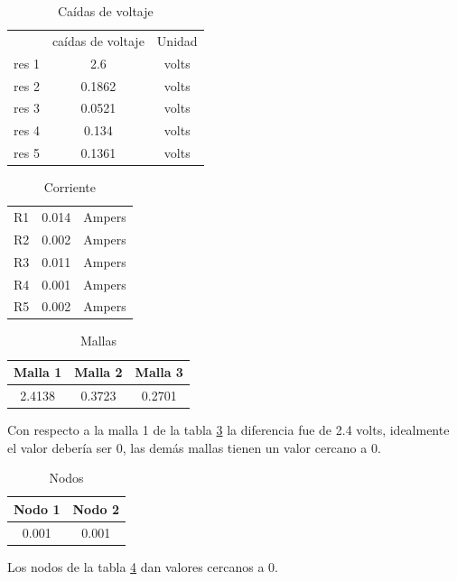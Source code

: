 \documentclass{article}
\begin{document}
\begin{table}[H]
\centering
\begin{tabular}{|c|c|c|}
    \hline
    & caídas de voltaje & Unidad\\
    res 1 & 2.6 & volts\\
    res 2 & 0.1862 & volts\\
    res 3 & 0.0521 & volts\\
    res 4 & 0.134 & volts\\
    res 5 & 0.1361 & volts\\
    \hline
\end{tabular}
\caption{Caídas de voltaje}
\label{tab:2}
\end{table}

\begin{table}[H]
\centering
\begin{tabular}{|c|c|c|}
    \hline
    R1 & 0.014 &Ampers\\
    R2 & 0.002 &Ampers\\
    R3 & 0.011 &Ampers\\
    R4 & 0.001 &Ampers\\
    R5 & 0.002 &Ampers\\
    \hline
\end{tabular}
\caption{Corriente}
\label{tab:3}
\end{table}

\begin{table}[H]
\centering
\begin{tabular}{|c|c|c|}
    \hline
    Malla 1 & Malla 2 & Malla 3\\
    \hline
    2.4138 & 0.3723	& 0.2701\\
    \hline
\end{tabular}
\caption{Mallas}
\label{tab:4}
\end{table}

Con respecto a la malla 1 de la tabla \ref{tab:4} la diferencia fue de 2.4 volts, idealmente el valor debería ser 0, las 
demás mallas tienen un valor cercano a 0.

\begin{table}[H]
\centering
\begin{tabular}{|c|c|}
    \hline
    Nodo 1 & Nodo 2\\ 
    \hline
    0.001 & 0.001 \\
    \hline
\end{tabular}
\caption{Nodos}
\label{tab:5}
\end{table}

Los nodos de la tabla \ref{tab:5} dan valores cercanos a 0.
\end{document}
